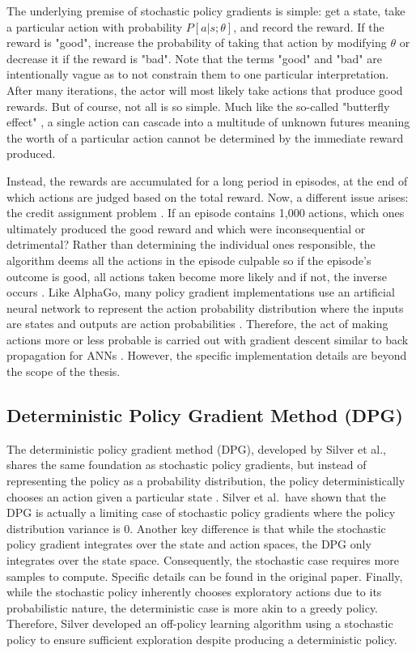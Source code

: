 The underlying premise of stochastic policy gradients is simple: get a state, take a particular action with probability $P[a|s;\theta]$, and record the reward. If the reward is "good", increase the probability of taking that action by modifying $\theta$ or decrease it if the reward is "bad". Note that the terms "good" and "bad" are intentionally vague as to not constrain them to one particular interpretation. After many iterations, the actor will most likely take actions that produce good rewards. But of course, not all is so simple. Much like the so-called "butterfly effect" \cite{Lorenz_1963}, a single action can cascade into a multitude of unknown futures meaning the worth of a particular action cannot be determined by the immediate reward produced.

Instead, the rewards are accumulated for a long period in episodes, at the end of which actions are judged based on the total reward. Now, a different issue arises: the credit assignment problem \cite{fu_2008}. If an episode contains 1,000 actions, which ones ultimately produced the good reward and which were inconsequential or detrimental? Rather than determining the individual ones responsible, the algorithm deems all the actions in the episode culpable so if the episode's outcome is good, all actions taken become more likely and if not, the inverse occurs \cite{karpathy_2016}. Like AlphaGo, many policy gradient implementations use an artificial neural network to represent the action probability distribution where the inputs are states and outputs are action probabilities \cite{silver_2017}. Therefore, the act of making actions more or less probable is carried out with gradient descent similar to back propagation for ANNs \cite{karpathy_2016}. However, the specific implementation details are beyond the scope of the thesis.

\subsection{Deterministic Policy Gradient Method (DPG)}
The deterministic policy gradient method (DPG), developed by Silver et al., shares the same foundation as stochastic policy gradients, but instead of representing the policy as a probability distribution, the policy deterministically chooses an action given a particular state \cite{silver_lever_heess_degris_wierstra_riedmiller}. Silver et al.\ have shown that the DPG is actually a limiting case of stochastic policy gradients where the policy distribution variance is 0. Another key difference is that while the stochastic policy gradient integrates over the state and action spaces, the DPG only integrates over the state space. Consequently, the stochastic case requires more samples to compute. Specific details can be found in the original paper. Finally, while the stochastic policy inherently chooses exploratory actions due to its probabilistic nature, the deterministic case is more akin to a greedy policy. Therefore, Silver developed an off-policy learning algorithm using a stochastic policy to ensure sufficient exploration despite producing a deterministic policy.

